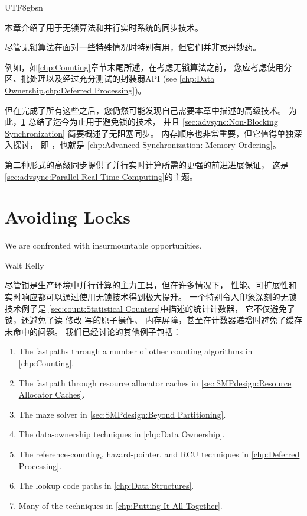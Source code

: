 
%

\begin{CJK}{UTF8}{gbsn}

本章介绍了用于无锁算法和并行实时系统的同步技术。

尽管无锁算法在面对一些特殊情况时特别有用，但它们并非灵丹妙药。

例如，如\cref{chp:Counting}章节末尾所述，在考虑无锁算法之前，
您应考虑使用分区、批处理以及经过充分测试的封装弱API
(see \cref{chp:Data Ownership,chp:Deferred Processing})。

但在完成了所有这些之后，您仍然可能发现自己需要本章中描述的高级技术。
为此，\cref{sec:advsync:Avoiding Locks} 总结了迄今为止用于避免锁的技术，
并且 \cref{sec:advsync:Non-Blocking Synchronization} 简要概述了无阻塞同步。
内存顺序也非常重要，但它值得单独深入探讨，
即 ，也就是
\cref{chp:Advanced Synchronization: Memory Ordering}。

第二种形式的高级同步提供了并行实时计算所需的更强的前进进展保证，
这是\cref{sec:advsync:Parallel Real-Time Computing}的主题。

\section{Avoiding Locks}
\label{sec:advsync:Avoiding Locks}
%
\epigraph{We are confronted with insurmountable opportunities.}
	 {Walt Kelly}

尽管锁是生产环境中并行计算的主力工具，但在许多情况下，
性能、可扩展性和实时响应都可以通过使用无锁技术得到极大提升。
一个特别令人印象深刻的无锁技术例子是
\cref{sec:count:Statistical Counters}中描述的统计计数器，
它不仅避免了锁，还避免了读-修改-写的原子操作、
内存屏障，甚至在计数器递增时避免了缓存未命中的问题。
我们已经讨论的其他例子包括：

\begin{enumerate}
\item	The fastpaths through a number of other counting algorithms
	in \cref{chp:Counting}.
\item	The fastpath through resource allocator caches in
	\cref{sec:SMPdesign:Resource Allocator Caches}.
\item	The maze solver in \cref{sec:SMPdesign:Beyond Partitioning}.
\item	The data-ownership techniques in \cref{chp:Data Ownership}.
\item	The reference-counting, hazard-pointer, and RCU techniques
	in \cref{chp:Deferred Processing}.
\item	The lookup code paths in \cref{chp:Data Structures}.
\item	Many of the techniques in \cref{chp:Putting It All Together}.
\end{enumerate}


\end{CJK}
